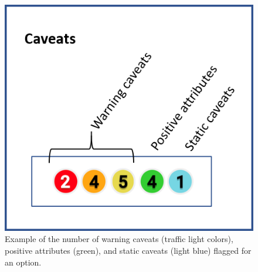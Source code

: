 \documentclass[
  11pt,
]{book}
\begin{document}
\begin{figure}

{\centering \includegraphics[width=0.35\linewidth]{images/caveats} 

}

\caption{Example of the number of warning caveats (traffic light colors), positive attributes (green), and static caveats (light blue) flagged for an option.}\label{fig:caveats}
\end{figure}
\end{document}
